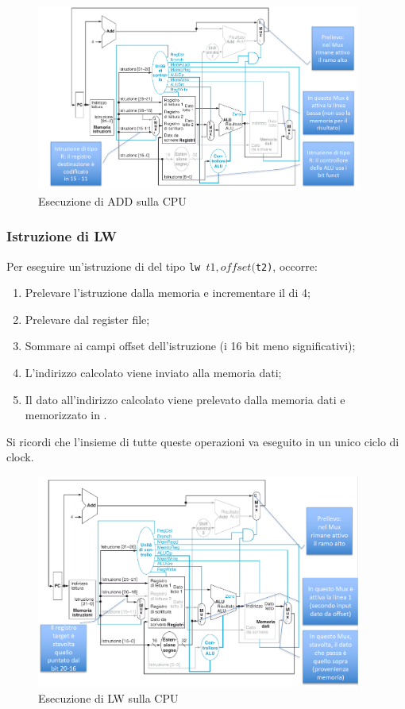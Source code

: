 \documentclass[class=book, crop=false, oneside]{standalone}
\begin{document}
\begin{figure}[H]
	\centering
	\includegraphics[width=0.95\textwidth,keepaspectratio]{es_add.png}
	\caption{Esecuzione di ADD sulla CPU}
\end{figure}

\subsubsection{Istruzione di LW}
Per eseguire un'istruzione di  del tipo \texttt{lw $t1, offset($t2)}, occorre:
\begin{enumerate}
	\item Prelevare l’istruzione dalla memoria e incrementare il  di 4;
	\item Prelevare  dal register file;
	\item Sommare  ai campi offset dell’istruzione (i 16 bit meno significativi);
	\item L'indirizzo calcolato viene inviato alla memoria dati;
	\item Il dato all'indirizzo calcolato viene prelevato dalla memoria dati e memorizzato in .
\end{enumerate}
Si ricordi che l'insieme di tutte queste operazioni va eseguito in un unico ciclo di clock.

\begin{figure}[H]
	\centering
	\includegraphics[width=0.95\textwidth,keepaspectratio]{es_lw.png}
	\caption{Esecuzione di LW sulla CPU}
\end{figure}
\end{document}
